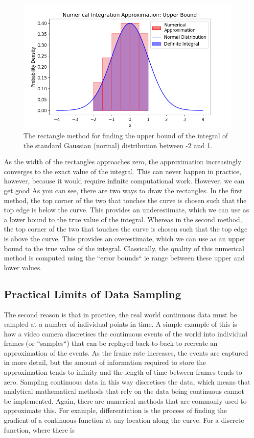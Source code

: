 \documentclass[12pt]{article}
\newcommand{\ndiFigCaption}[1]{The rectangle method for finding the #1 bound of the integral of the standard Gaussian (normal) distribution between -2 and 1.}
\begin{document}
    \begin{figure}[H]
        \centering
        \includegraphics[width=0.8\linewidth]{figures/ndi-num2/ndi-num2_}
        \caption{\ndiFigCaption{upper}}
        \label{fig:ndi-num2_}
    \end{figure}
    As the width of the rectangles approaches zero, the approximation increasingly converges to the exact value of the integral.
    This can never happen in practice, however, because it would require infinite computational work.
    However, we can get good
    As you can see, there are two ways to draw the rectangles.
    In the first method, the top corner of the two that touches the curve is chosen such that the top edge is below the curve.
    This provides an underestimate, which we can use as a lower bound to the true value of the integral.
    Whereas in the second method, the top corner of the two that touches the curve is chosen such that the top edge is above the curve.
    This provides an overestimate, which we can use as an upper bound to the true value of the integral.
    Classically, the quality of this numerical method is computed using the ``error bounds`` ie range between these upper and lower values.

    \subsection{Practical Limits of Data Sampling}
    The second reason is that in practice, the real world continuous data must be sampled at a number of individual points in time.
    A simple example of this is how a video camera discretises the continuous events of the world into individual frames (or ``samples``) that can be replayed back-to-back to recreate an approximation of the events.
    As the frame rate increases, the events are captured in more detail, but the amount of information required to store the approximation tends to infinity and the length of time between frames tends to zero.
    Sampling continuous data in this way discretises the data, which means that analytical mathematical methods that rely on the data being continuous cannot be implemented.
    Again, there are numerical methods that are commonly used to approximate this.
    For example, differentiation is the process of finding the gradient of a continuous function at any location along the curve.
    For a discrete function, where there is
\end{document}
